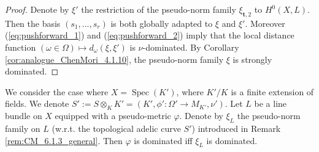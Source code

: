 \documentclass [11pt,reqno]{amsart}
\newcommand{\1}{\mathmybb{1}}
\def\Spec{\operatorname{Spec}}
\begin{document}
\begin{proof}
Denote by $\xi'$ the restriction of the pseudo-norm family $\xi_{\mathbf{t},2}$ to $H^{0}(X,L)$. Then the basis $(s_1,...,s_r)$ is both globally adapted to $\xi$ and $\xi'$. Moreover (\ref{eq:pushforward_1}) and (\ref{eq:pushforward_2}) imply that the local distance function $(\omega\in\Omega) \mapsto d_{\omega}(\xi,\xi')$ is $\nu$-dominated. By Corollary \ref{cor:analogue_ChenMori_4.1.10}, the pseudo-norm family $\xi$ is strongly dominated.
\end{proof}


\begin{proposition}
\label{prop:CM_6.1.18_general}
We consider the case where $X=\Spec(K')$, where $K'/K$ is a finite extension of fields. We denote $S':=S \otimes_{K} K' =(K',\phi' : \Omega'\to M_{K'},\nu')$. Let $L$ be a line bundle on $X$ equipped with a pseudo-metric $\varphi$. Denote by $\xi_L$ the pseudo-norm family on $L$ (w.r.t. the topological adelic curve $S'$) introduced in Remark \ref{rem:CM_6.1.3_general}. Then $\varphi$ is dominated iff $\xi_L$  is dominated.
\end{proposition}
\end{document}
